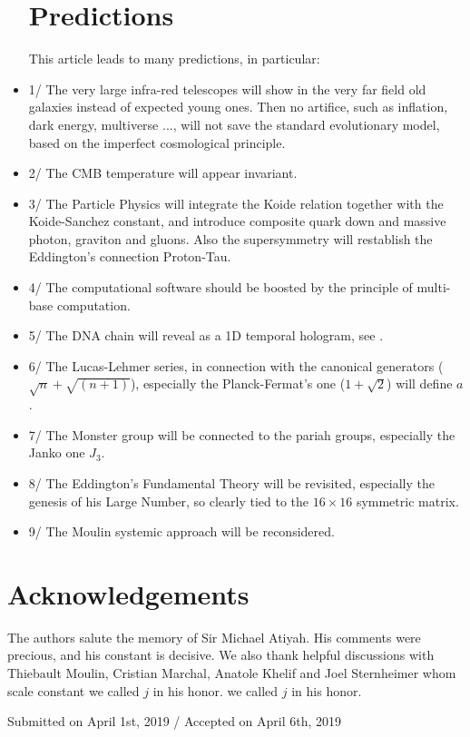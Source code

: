 \documentclass[twoside,draft]{article}
\begin{document}
\begin{sloppypar}
\begin{itemize}
\section{Predictions}

 

      This article leads to many predictions, in particular:
\item 1/  The very large infra-red telescopes will show in the very far field old galaxies instead of expected young ones. Then no artifice, such as inflation, dark energy, multiverse ..., will not save the standard evolutionary model, based on the imperfect cosmological principle.
\item 2/ The CMB temperature will appear invariant. 
\item 3/ The Particle Physics will integrate the Koide relation together with the Koide-Sanchez constant, and introduce composite quark down and massive photon, graviton and gluons. Also the supersymmetry will restablish the Eddington's connection Proton-Tau.
\item 4/ The computational software should be boosted by the principle of multi-base computation.
\item 5/ The DNA chain will reveal as a 1D temporal hologram, see \cite{Widom}.
\item 6/ The Lucas-Lehmer series, in connection with the canonical generators ($\sqrt{n}+\sqrt{(n+1)}$), especially the Planck-Fermat's one ($1+\sqrt2$) will define $a$.
\item 7/ The Monster group will be connected to the pariah groups, especially the Janko one $J_3$.
\item 8/ The Eddington's Fundamental Theory will be revisited, especially the genesis of his Large Number, so clearly tied to the $16 \times 16$ symmetric matrix.
\item 9/ The Moulin systemic approach will be reconsidered.
\end{itemize}

\section*{Acknowledgements}
The authors salute the memory of Sir Michael Atiyah. His comments were precious, and his constant is decisive. We also thank helpful discussions with Thiebault Moulin, Cristian Marchal, Anatole Khelif and Joel Sternheimer whom scale constant we called $j$ in his honor. 
we called $j$ in his honor.
%
\begin{flushright}\footnotesize
Submitted on April 1st, 2019 / Accepted on April 6th, 2019
\end{flushright}



\end{sloppypar}
\end{document}
